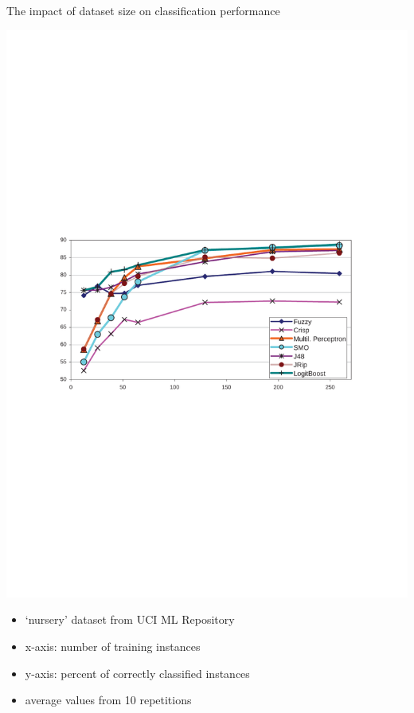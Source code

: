 \documentclass[xcolor=dvipsnames]{beamer}
\begin{document}
\begin{frame}{The impact of dataset size on classification performance}
\centerline{\includegraphics[width=1.0\hsize]{img/corect_growing_learninig_instances}}

\begin{itemize}
	\item `nursery' dataset from UCI ML Repository
	\item x-axis: number of training instances
	\item y-axis: percent of correctly classified instances
	\item average values from 10 repetitions
\end{itemize}

\end{frame}
\end{document}
